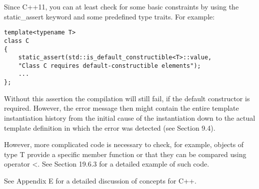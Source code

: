 Since C++11, you can at least check for some basic constraints by using the static\_assert keyword and some predefined type traits. For example:

\begin{lstlisting}[style=styleCXX]
template<typename T>
class C
{
	static_assert(std::is_default_constructible<T>::value,
	"Class C requires default-constructible elements");
	...
};
\end{lstlisting}

Without this assertion the compilation will still fail, if the default constructor is required. However, the error message then might contain the entire template instantiation history from the initial cause of the instantiation down to the actual template definition in which the error was detected (see Section 9.4).

However, more complicated code is necessary to check, for example, objects of type T provide a specific member function or that they can be compared using operator <. See Section 19.6.3 for a detailed example of such code. 

See Appendix E for a detailed discussion of concepts for C++.















